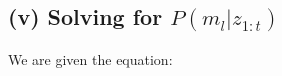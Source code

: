 \documentclass[template,12pt,a4paper,enabledeprecatedfontcommands]{template}
\begin{document}
\subsection*{(v) Solving for \( P(m_l | z_{1:t}) \)}
We are given the equation:

\end{document}
